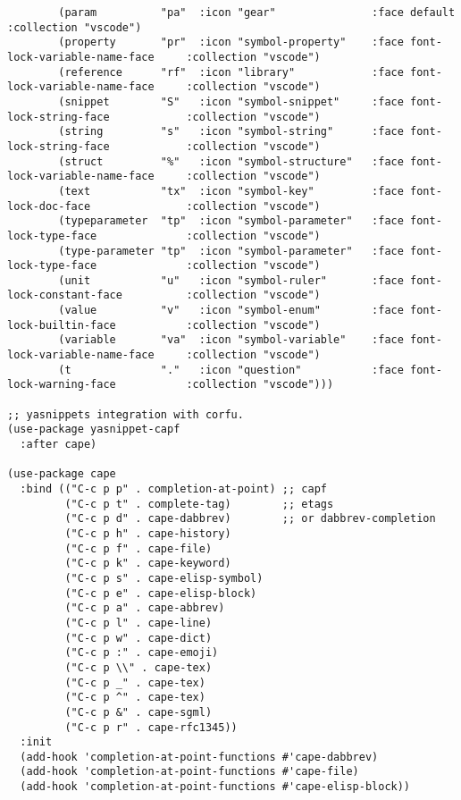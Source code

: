 \documentclass[11pt]{article}
\begin{document}
\begin{verbatim}
        (param          "pa"  :icon "gear"               :face default                          :collection "vscode")
        (property       "pr"  :icon "symbol-property"    :face font-lock-variable-name-face     :collection "vscode")
        (reference      "rf"  :icon "library"            :face font-lock-variable-name-face     :collection "vscode")
        (snippet        "S"   :icon "symbol-snippet"     :face font-lock-string-face            :collection "vscode")
        (string         "s"   :icon "symbol-string"      :face font-lock-string-face            :collection "vscode")
        (struct         "%"   :icon "symbol-structure"   :face font-lock-variable-name-face     :collection "vscode")
        (text           "tx"  :icon "symbol-key"         :face font-lock-doc-face               :collection "vscode")
        (typeparameter  "tp"  :icon "symbol-parameter"   :face font-lock-type-face              :collection "vscode")
        (type-parameter "tp"  :icon "symbol-parameter"   :face font-lock-type-face              :collection "vscode")
        (unit           "u"   :icon "symbol-ruler"       :face font-lock-constant-face          :collection "vscode")
        (value          "v"   :icon "symbol-enum"        :face font-lock-builtin-face           :collection "vscode")
        (variable       "va"  :icon "symbol-variable"    :face font-lock-variable-name-face     :collection "vscode")
        (t              "."   :icon "question"           :face font-lock-warning-face           :collection "vscode")))

;; yasnippets integration with corfu.
(use-package yasnippet-capf
  :after cape)

(use-package cape
  :bind (("C-c p p" . completion-at-point) ;; capf
         ("C-c p t" . complete-tag)        ;; etags
         ("C-c p d" . cape-dabbrev)        ;; or dabbrev-completion
         ("C-c p h" . cape-history)
         ("C-c p f" . cape-file)
         ("C-c p k" . cape-keyword)
         ("C-c p s" . cape-elisp-symbol)
         ("C-c p e" . cape-elisp-block)
         ("C-c p a" . cape-abbrev)
         ("C-c p l" . cape-line)
         ("C-c p w" . cape-dict)
         ("C-c p :" . cape-emoji)
         ("C-c p \\" . cape-tex)
         ("C-c p _" . cape-tex)
         ("C-c p ^" . cape-tex)
         ("C-c p &" . cape-sgml)
         ("C-c p r" . cape-rfc1345))
  :init
  (add-hook 'completion-at-point-functions #'cape-dabbrev)
  (add-hook 'completion-at-point-functions #'cape-file)
  (add-hook 'completion-at-point-functions #'cape-elisp-block))


\end{verbatim}
\end{document}
